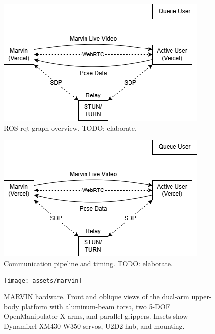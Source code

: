 \documentclass[sigconf]{acmart}
\begin{document}
\begin{figure}[htbp]
  \centering
  \includegraphics[width=\linewidth]{assets/system-diagram}
  \caption{ROS rqt graph overview. TODO: elaborate.}
  \label{fig:system}
\end{figure}

\begin{figure}[htbp]
  \centering
  \includegraphics[width=\linewidth]{assets/system-diagram.png}
  \caption{Communication pipeline and timing. TODO: elaborate.}
  \label{fig:pipeline}
\end{figure}

\begin{figure}[htbp]
  \centering
  \texttt{[image: assets/marvin]}
  \caption{MARVIN hardware. Front and oblique views of the dual-arm upper-body platform with aluminum-beam torso, two 5-DOF OpenManipulator-X arms, and parallel grippers. Insets show Dynamixel XM430-W350 servos, U2D2 hub, and mounting.}
  \label{fig:photos}
\end{figure}
\end{document}
